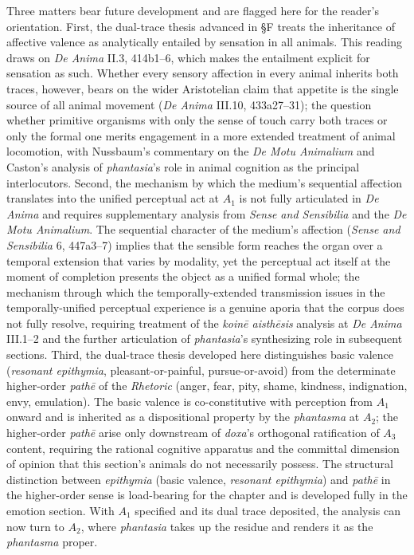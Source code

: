 Three matters bear future development and are flagged here for the reader's orientation. First, the dual-trace thesis advanced in §F treats the inheritance of affective valence as analytically entailed by sensation in all animals. This reading draws on \textit{De Anima} II.3, 414b1--6, which makes the entailment explicit for sensation as such. Whether every sensory affection in every animal inherits both traces, however, bears on the wider Aristotelian claim that appetite is the single source of all animal movement (\textit{De Anima} III.10, 433a27--31); the question whether primitive organisms with only the sense of touch carry both traces or only the formal one merits engagement in a more extended treatment of animal locomotion, with Nussbaum's commentary on the \textit{De Motu Animalium} and Caston's analysis of \textit{phantasia}'s role in animal cognition as the principal interlocutors. Second, the mechanism by which the medium's sequential affection translates into the unified perceptual act at $A_1$ is not fully articulated in \textit{De Anima} and requires supplementary analysis from \textit{Sense and Sensibilia} and the \textit{De Motu Animalium}. The sequential character of the medium's affection (\textit{Sense and Sensibilia} 6, 447a3--7) implies that the sensible form reaches the organ over a temporal extension that varies by modality, yet the perceptual act itself at the moment of completion presents the object as a unified formal whole; the mechanism through which the temporally-extended transmission issues in the temporally-unified perceptual experience is a genuine aporia that the corpus does not fully resolve, requiring treatment of the \textit{koinē aisthēsis} analysis at \textit{De Anima} III.1--2 and the further articulation of \textit{phantasia}'s synthesizing role in subsequent sections. Third, the dual-trace thesis developed here distinguishes basic valence (\textit{resonant epithymia}, pleasant-or-painful, pursue-or-avoid) from the determinate higher-order \textit{pathē} of the \textit{Rhetoric} (anger, fear, pity, shame, kindness, indignation, envy, emulation). The basic valence is co-constitutive with perception from $A_1$ onward and is inherited as a dispositional property by the \textit{phantasma} at $A_2$; the higher-order \textit{pathē} arise only downstream of \textit{doxa}'s orthogonal ratification of $A_3$ content, requiring the rational cognitive apparatus and the committal dimension of opinion that this section's animals do not necessarily possess. The structural distinction between \textit{epithymia} (basic valence, \textit{resonant epithymia}) and \textit{pathē} in the higher-order sense is load-bearing for the chapter and is developed fully in the emotion section. With $A_1$ specified and its dual trace deposited, the analysis can now turn to $A_2$, where \textit{phantasia} takes up the residue and renders it as the \textit{phantasma} proper.
